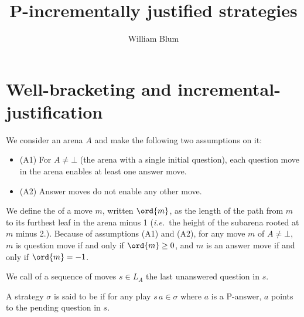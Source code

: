 
\newcommand{\subseqof}{\sqsubseteq}
\newcommand{\prefixof}{\leqslant}
\newcommand{\suffixof}{\geqslant}


\author{William Blum}
\title{P-incrementally justified strategies}


\maketitle 

\section{Well-bracketing and incremental-justification}

We consider an arena $A$ and make the following two assumptions on it:
\begin{itemize}
\item (A1) For $A \neq \bot$ (the arena with a single initial question), each question move in the arena enables at least one answer move.
\item (A2) Answer moves do not enable any other move.
\end{itemize}

We define the  of a move $m$, written $\ord{m}$, as
the length of the path from $m$ to its furthest leaf in the arena minus 1
({\it i.e.}~the height of the subarena rooted at $m$ minus 2.).
Because of assumptions (A1) and (A2),
for any move $m$ of $A \neq \bot$, $m$ is question move if and only if $\ord{m} \geq 0$, and $m$ is an answer move if and only if $\ord{m} = -1$.





We call  of a sequence of moves $s \in L_A$ the last unanswered question in $s$.

\begin{definition}\rm
A strategy $\sigma$ is said to be  if for any play $s \, a \in \sigma$ where $a$ is a  P-answer, $a$ points to the pending question in $s$.
\end{definition}



